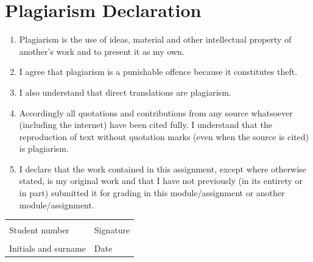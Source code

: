 \chapter*{Plagiarism Declaration}

\begin{enumerate}
	\item Plagiarism is the use of ideas, material and other intellectual property of another's work and to present it as my own.
	
	\item I agree that plagiarism is a punishable offence because it constitutes theft.
	
	\item I also understand that direct translations are plagiarism.
	
	\item Accordingly all quotations and contributions from any source whatsoever (including the internet) have been cited fully. I understand that the reproduction of text without quotation marks (even when the source is cited) is plagiarism.
	
	\item I declare that the work contained in this assignment, except where otherwise stated, is my original work and that I have not previously (in its entirety or in part) submitted it for grading in this module/assignment or another module/assignment.
\end{enumerate}
\noindent
\begin{tabularx}{\textwidth}{|X|p{4cm}|}
	\hline
	&                       \\[4ex]
	Student number          & Signature \\
	\hline
	&                       \\[4ex]
	Initials and surname    & Date      \\
	\hline
\end{tabularx}
